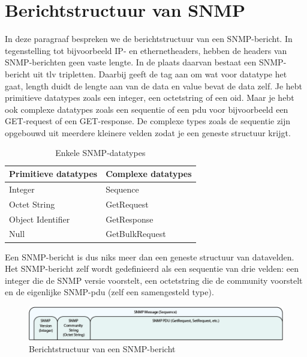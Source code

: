 \section{Berichtstructuur van SNMP}
\label{snmp-berichtstructuur}

In deze paragraaf bespreken we de berichtstructuur van een SNMP-bericht.
In tegenstelling tot bijvoorbeeld IP- en ethernetheaders, hebben de headers van SNMP-berichten geen vaste lengte.
In de plaats daarvan bestaat een SNMP-bericht uit \gls{tlv} tripletten\cite{moreau}.
Daarbij geeft de tag aan om wat voor datatype het gaat, length duidt de lengte aan van de data en value bevat de data zelf.
Je hebt primitieve datatypes zoals een integer, een octetstring of een \gls{oid}.
Maar je hebt ook complexe datatypes zoals een sequentie of een \gls{pdu} voor bijvoorbeeld een GET-request of een GET-response.
De complexe types zoals de sequentie zijn opgebouwd uit meerdere kleinere velden zodat je een geneste structuur krijgt\cite{snmp-message-format}.

\begin{table}[h]
\centering
\begin{tabular}{@{}ll@{}}
\toprule
Primitieve datatypes & Complexe datatypes \\ \midrule
Integer              & Sequence           \\
Octet String         & GetRequest         \\
Object Identifier    & GetResponse        \\
Null                 & GetBulkRequest     \\ \bottomrule
\end{tabular}
\caption{Enkele SNMP-datatypes}
\label{tabel-datatypes}
\end{table}

Een SNMP-bericht is dus niks meer dan een geneste structuur van datavelden.
Het SNMP-bericht zelf wordt gedefinieerd als een sequentie van drie velden: een integer die de SNMP versie voorstelt, een octetstring die de community voorstelt en
de eigenlijke SNMP-\gls{pdu} (zelf een samengesteld type).

\begin{figure}[h]
	\centering
	\includegraphics[scale=0.45]{figures/snmp/berichtstructuur-1}
	\caption[Berichtstructuur van een SNMP-bericht]{Berichtstructuur van een SNMP-bericht\cite{snmp-message-format}}
	\label{fig-berichtstructuur-1}
\end{figure}

